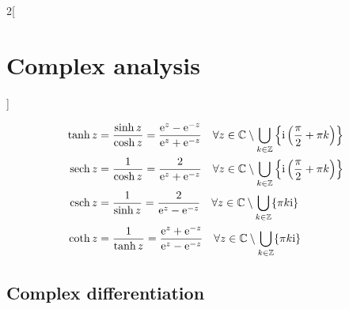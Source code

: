 \documentclass[../../../main_math.tex]{subfiles}
\begin{document}
\begin{multicols}{2}[\section{Complex analysis}]
\begin{definition}
    \begin{align*}
      \tanh z & = \frac{\sinh z}{\cosh z}=\frac{\exp{z}-\exp{-z}}{\exp{z}+\exp{-z}}\quad \forall z\in\CC\setminus\bigcup_{k\in\ZZ}\left\{\ii\left(\frac{\pi}{2}+\pi k\right)\right\} \\
      \sech z & = \frac{1}{\cosh z}=\frac{2}{\exp{z}+\exp{-z}}\quad \forall z\in\CC\setminus\bigcup_{k\in\ZZ}\left\{\ii\left(\frac{\pi}{2}+\pi k\right)\right\}                      \\
      \csch z & = \frac{1}{\sinh z}=\frac{2}{\exp{z}-\exp{-z}}\quad\forall z\in\CC\setminus\bigcup_{k\in\ZZ}\{\pi k\ii\}                                                             \\
      \coth z & = \frac{1}{\tanh z}=\frac{\exp{z}+\exp{-z}}{\exp{z}-\exp{-z}}\quad\forall z\in\CC\setminus\bigcup_{k\in\ZZ}\{\pi k\ii\}
    \end{align*}
  \end{definition}
  \subsection{Complex differentiation}

\end{multicols}
\end{document}
